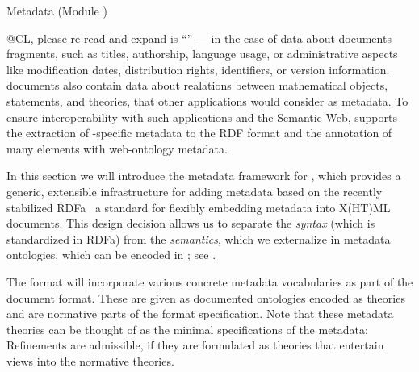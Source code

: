 
\begin{module}[id=genmeta]
\begin{omgroup}[creators={miko,clange},short={Metadata},id=metadatachap]
  {Metadata (Module {})}

\begin{newpart}{@CL, please re-read and expand}
   is ``{}'' --- in the case of
  \omdoc data about documents fragments, such as titles, authorship, language usage, or
  administrative aspects like modification dates, distribution rights, identifiers, or
  version information. \omdoc documents also contain data about realations between
  mathematical objects, statements, and theories, that other applications would consider
  as metadata. To ensure interoperability with such applications and the Semantic Web,
  \omdoc supports the extraction of \omdoc-specific metadata to the RDF
  format and the annotation of many \omdoc elements with web-ontology
  metadata.

  In this section we will introduce the metadata framework for {},
  which provides a generic, extensible infrastructure for adding metadata based on the
  recently stabilized RDFa~\cite{AdidaEtAl08:RDFa} a standard for flexibly embedding
  metadata into X(HT)ML documents. This design decision allows us to separate the
  {\emph{syntax}} (which is standardized in RDFa) from the {\emph{semantics}}, which we
  externalize in metadata ontologies, which can be encoded in \omdoc; see
  {}.



\begin{omtext}
  The \omdoc format will incorporate various concrete metadata vocabularies as part of
  the document format. These are given as documented ontologies encoded as \omdoc
  theories and are normative parts of the format specification. Note that these metadata
  theories can be
  thought of as the minimal specifications of the metadata: Refinements are admissible, if
  they are formulated as \omdoc theories that entertain views into the normative
  theories.
\end{omtext}


\end{newpart}
\end{omgroup}
\end{module}
